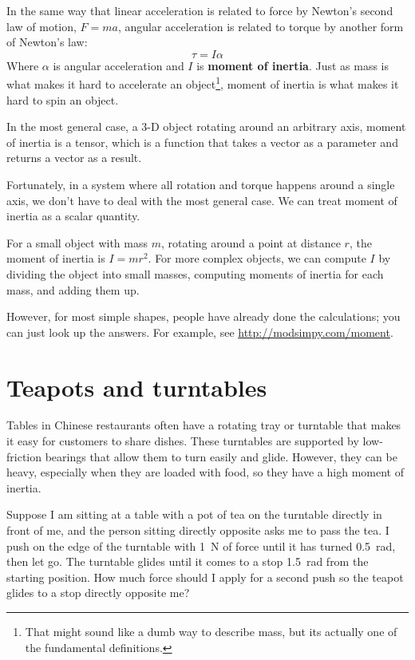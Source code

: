 \documentclass[12pt]{book}
\theoremstyle{exercise}
\begin{document}
In the same way that linear acceleration is related to force by Newton's second law of motion, $F=ma$, angular acceleration is related to torque by another form of Newton's law:
%
\[ \tau = I \alpha \]
%
Where $\alpha$ is angular acceleration and $I$ is {\bf moment of inertia}.  Just as mass is what makes it hard to accelerate an object\footnote{That might sound like a dumb way to describe mass, but its actually one of the fundamental definitions.}, moment of inertia is what makes it hard to spin an object.


In the most general case, a 3-D object rotating around an arbitrary axis, moment of inertia is a tensor, which is a function that takes a vector as a parameter and returns a vector as a result.


Fortunately, in a system where all rotation and torque happens around a single axis, we don't have to deal with the most general case.  We can treat moment of inertia as a scalar quantity.


For a small object with mass $m$, rotating around a point at distance $r$, the moment of inertia is $I = m r^2$.  For more complex objects, we can compute $I$ by dividing the object into small masses, computing moments of inertia for each mass, and adding them up.

However, for most simple shapes, people have already done the calculations; you can just look up the answers.  For example, see \url{http://modsimpy.com/moment}.


\section{Teapots and turntables}

Tables in Chinese restaurants often have a rotating tray or turntable
that makes it easy for customers to share dishes. These turntables are
supported by low-friction bearings that allow them to turn easily and
glide. However, they can be heavy, especially when they are loaded with
food, so they have a high moment of inertia.


Suppose I am sitting at a table with a pot of tea on the turntable
directly in front of me, and the person sitting directly opposite asks
me to pass the tea. I push on the edge of the turntable with \SI{1}{\newton} of force until it has turned \SI{0.5}{\radian}, then let go. The turntable glides until it comes to a stop \SI{1.5}{\radian} from the starting position. How much force should I apply for a second push so the teapot glides to a
stop directly opposite me?
\end{document}
